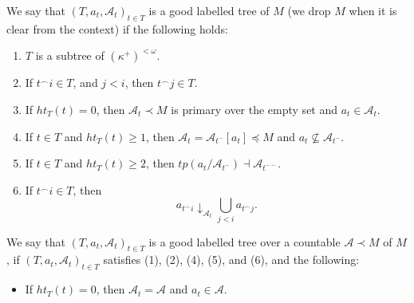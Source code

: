 \documentclass[10pt,a4paper]{amsart}
\begin{document}
\begin{defn}\label{good_labelled_tree_empt}
    We say that $(T,a_t,\mathcal{A}_t)_{t\in T}$ is a good labelled tree of $M$ (we drop $M$ when it is clear from the context) if the following holds:
    \begin{enumerate}
        \item $T$ is a subtree of $(\kappa^+)^{<\omega}$.
        \item If $t^\frown i\in T$, and $j<i$, then $t^\frown j\in T$.
        \item If $ht_T(t)=0$, then $\mathcal{A}_{t}\prec M$ is primary over the empty set and $a_t\in\mathcal{A}_{t}$.
        \item If $t\in T$ and $ht_T(t)\ge 1$, then $\mathcal{A}_t =\mathcal{A}_{t^-}[a_t]\preceq M$ and $a_t\not \subseteq\mathcal{A}_{t^-}$.
        \item If $t\in T$ and $ht_T(t)\ge 2$, then $tp(a_t / \mathcal{A}_{t^-})\dashv \mathcal{A}_{t^{--}}$.
        \item If $t^\frown i\in T$, then $$a_{t^\frown i}\downarrow_{\mathcal{A}_t} \bigcup_{j<i}a_{t^\frown j}.$$
    \end{enumerate}
    We say that $(T,a_t,\mathcal{A}_t)_{t\in T}$ is a good labelled tree over a countable $\mathcal{A}\prec M$ of $M$, if $(T,a_t,\mathcal{A}_t)_{t\in T}$ satisfies (1), (2), (4), (5), and (6), and the following:
\begin{itemize}
    \item [($3'$)] If $ht_T(t)=0$, then $\mathcal{A}_{t}=\mathcal{A}$ and $a_t\in \mathcal{A}$.
\end{itemize}
\end{defn}
\end{document}
